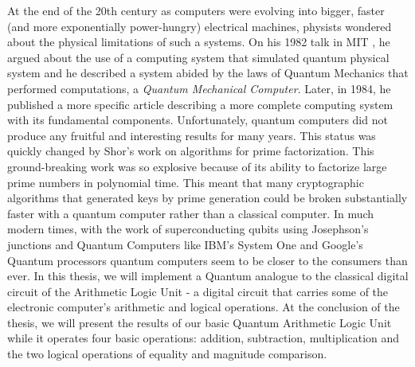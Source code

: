 
At the end of the 20th century as computers were evolving into bigger, faster (and more exponentially power-hungry) electrical machines,
physists wondered about the physical limitations of such a systems. On his 1982 talk in MIT \cite{Feynman1982}, he argued about the
use of a computing system that simulated quantum physical system and he described a system abided by the laws of Quantum Mechanics that performed
computations, a \textit{Quantum Mechanical Computer}. Later, in 1984, he published a more specific article \cite{Feynman1984} describing a
more complete computing system with its fundamental components. Unfortunately, quantum computers did not produce any fruitful
and interesting results for many years. This status was quickly changed by Shor's work \cite{Shor1997} on algorithms for prime factorization.
This ground-breaking work was so explosive because of its ability to factorize large prime numbers in polynomial time.
This meant that many cryptographic algorithms that generated keys by prime generation could be broken substantially faster with a quantum
computer rather than a classical computer. In much modern times, with the work of superconducting qubits using Josephson's junctions
\cite{JOSEPHSON1962251} and Quantum Computers like IBM's System One \cite{IBMQuantum2021} and Google's Quantum processors \cite{Google2014}
quantum computers seem to be closer to the consumers than ever. In this thesis, we will implement a Quantum analogue to the classical
digital circuit of the Arithmetic Logic Unit - a digital circuit that carries some of the electronic computer's arithmetic and logical
operations. At the conclusion of the thesis, we will present the results of our basic Quantum Arithmetic Logic Unit while it operates
four basic operations: addition, subtraction, multiplication and the two logical operations of equality and magnitude comparison.